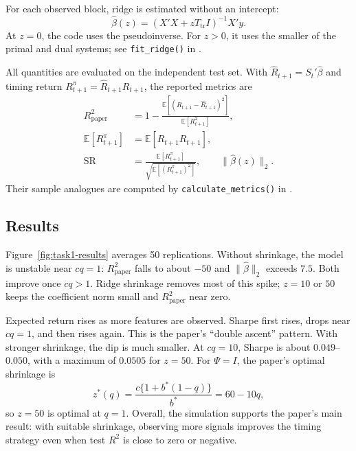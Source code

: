 \documentclass[11pt]{article}
\begin{document}
For each observed block, ridge is estimated without an intercept:
\begin{equation}
    \widehat\beta(z)
    =\left(X'X+zT_{\mathrm{tr}}I\right)^{-1}X'y.
\end{equation}
At $z=0$, the code uses the pseudoinverse. For $z>0$, it uses the smaller of
the primal and dual systems; see \texttt{fit\_ridge()} in
.

All quantities are evaluated on the independent test set. With $\widehat R_{t+1}=S_t'\widehat\beta$ and timing return $R^\pi_{t+1}=\widehat R_{t+1}R_{t+1}$, the reported metrics are
\begin{align}
R^2_{\mathrm{paper}}
    &=1-\frac{\mathbb E[(R_{t+1}-\widehat R_{t+1})^2]}
                 {\mathbb E[R_{t+1}^2]}, \\
\mathbb E[R^\pi_{t+1}]
    &=\mathbb E[\widehat R_{t+1}R_{t+1}], \\
\mathrm{SR}
    &=\frac{\mathbb E[R^\pi_{t+1}]}
            {\sqrt{\mathbb E[(R^\pi_{t+1})^2]}},
\qquad
\|\widehat\beta(z)\|_2.
\end{align}
Their sample analogues are computed by \texttt{calculate\_metrics()} in .

\subsection{Results}

Figure~\ref{fig:task1-results} averages 50 replications. Without shrinkage,
the model is unstable near $cq=1$: $R^2_{\mathrm{paper}}$ falls to about
$-50$ and $\|\widehat\beta\|_2$ exceeds $7.5$. Both improve once $cq>1$.
Ridge shrinkage removes most of this spike; $z=10$ or $50$ keeps the
coefficient norm small and $R^2_{\mathrm{paper}}$ near zero.

Expected return rises as more features are observed. Sharpe first rises,
drops near $cq=1$, and then rises again. This is the paper's ``double
ascent'' pattern. With stronger shrinkage, the dip is much smaller. At
$cq=10$, Sharpe is about $0.049$--$0.050$, with a maximum of $0.0505$ for
$z=50$. For $\Psi=I$, the paper's optimal shrinkage is
\begin{equation}
    z^*(q)=\frac{c\{1+b^*(1-q)\}}{b^*}=60-10q,
\end{equation}
so $z=50$ is optimal at $q=1$. Overall, the simulation supports the paper's
main result: with suitable shrinkage, observing more signals improves the
timing strategy even when test $R^2$ is close to zero or negative.
\end{document}
